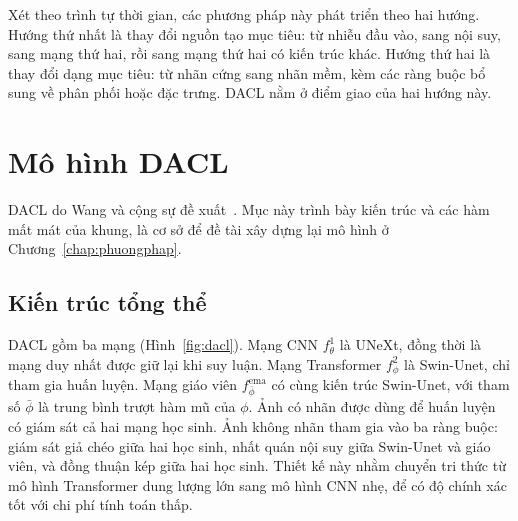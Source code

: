 Xét theo trình tự thời gian, các phương pháp này phát triển theo hai hướng. Hướng thứ nhất là thay đổi nguồn tạo mục tiêu: từ nhiễu đầu vào, sang nội suy, sang mạng thứ hai, rồi sang mạng thứ hai có kiến trúc khác. Hướng thứ hai là thay đổi dạng mục tiêu: từ nhãn cứng sang nhãn mềm, kèm các ràng buộc bổ sung về phân phối hoặc đặc trưng. DACL nằm ở điểm giao của hai hướng này.

\section{Mô hình DACL}
\label{sec:lit-dacl}

DACL do Wang và cộng sự đề xuất~\cite{wang2026dacl}. Mục này trình bày kiến trúc và các hàm mất mát của khung, là cơ sở để đề tài xây dựng lại mô hình ở Chương~\ref{chap:phuongphap}.

\subsection{Kiến trúc tổng thể}

DACL gồm ba mạng (Hình~\ref{fig:dacl}). Mạng CNN $f^1_\theta$ là UNeXt, đồng thời là mạng duy nhất được giữ lại khi suy luận. Mạng Transformer $f^2_\phi$ là Swin-Unet, chỉ tham gia huấn luyện. Mạng giáo viên $f^{\mathrm{ema}}_{\bar\phi}$ có cùng kiến trúc Swin-Unet, với tham số $\bar\phi$ là trung bình trượt hàm mũ của $\phi$. Ảnh có nhãn được dùng để huấn luyện có giám sát cả hai mạng học sinh. Ảnh không nhãn tham gia vào ba ràng buộc: giám sát giả chéo giữa hai học sinh, nhất quán nội suy giữa Swin-Unet và giáo viên, và đồng thuận kép giữa hai học sinh. Thiết kế này nhằm chuyển tri thức từ mô hình Transformer dung lượng lớn sang mô hình CNN nhẹ, để có độ chính xác tốt với chi phí tính toán thấp.

